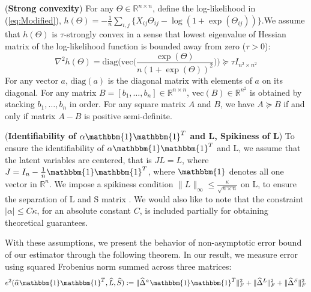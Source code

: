 \documentclass[AMS,STIX1COL]{WileyNJD-v2}
\begin{document}
{\begin{assumption}(\textbf{Strong convexity})  \label{Ass:1}
For any $\Theta \in \mathbb{R}^{n\times n}$, define the log-likelihood in (\ref{eq:Modified}), $h(\Theta) = -\frac{1}{n}\sum_{i,j} \big\{ X_{ij}\Theta_{ij} - \log(1+\exp(\Theta_{ij})) \big\}$.We assume that $h(\Theta)$ is $\tau$-strongly convex in a sense that lowest eigenvalue of Hessian matrix of the log-likelihood function is bounded away from zero ($\tau > 0$):
\[
\nabla^{2}h(\Theta) = \mbox{diag}\Big(\mbox{vec}\Big(\frac{\exp(\Theta)}{n(1+\exp(\Theta))^{2}}
\Big)\Big) \succcurlyeq \tau I_{n^{2} \times n^{2}}
\]
For any vector $a$, $\mbox{diag}(a)$ is the diagonal matrix with elements of $a$ on its diagonal.
For any matrix $B=[b_1,\dots,b_n]\in\mathbb{R}^{n \times n}$, $\mbox{vec}(B)\in\mathbb{R}^{n^2}$ is obtained by stacking $ b_1,\dots, b_{n}$ in order.
For any square matrix $A$ and $B$, we have $ A \succcurlyeq B $ if and only if matrix $A-B$ is positive semi-definite.
\end{assumption}

\begin{assumption} (\textbf{Identifiability of $\alpha\mathbbm{1}\mathbbm{1}^T$ and L, Spikiness of L}) \label{Ass:2}
To ensure the identifiability of $\alpha\mathbbm{1}\mathbbm{1}^T$ and L, we assume that the latent variables are centered, that is $JL=L$, where $J=I_{n}-\frac{1}{n}\mathbbm{1}\mathbbm{1}^T$, where $\mathbbm{1}$ denotes all one vector in $\mathbb{R}^{n}$. We impose a spikiness condition $\|L\|_{\infty}\leq\frac{\kappa}{\sqrt{n \times n}}$ on L, to ensure the separation of L and S matrix \cite{agarwal2012noisy}. We would also like to note that the constraint $|\alpha|\leq C\kappa$, for an absolute constant $C$, is included partially for obtaining theoretical guarantees.
\end{assumption}

With these assumptions, we present the behavior of non-asymptotic error bound of our estimator through the following theorem. In our result, we measure error using squared Frobenius norm summed across three matrices:
\[
    e^{2}(\widehat{\alpha}\mathbbm{1}\mathbbm{1}^T,\widehat{L},\widehat{S})
    :=\|\widehat{\Delta}^{\alpha}\mathbbm{1}\mathbbm{1}^T\|_{F}^{2} + \|\widehat{\Delta}^{L}\|_{F}^{2} + \|\widehat{\Delta}^{S}\|_{F}^{2}
\]

}
\end{document}
